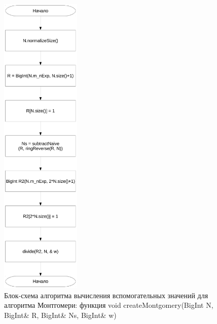 \documentclass[a4paper,12pt]{article} %
\begin{document}
\begin{figure}[ht]
	\centering
	\includegraphics[width=0.34\textwidth]{lr5_createMontgomery.pdf}
	\caption{
		Блок-схема алгоритма вычисления вспомогательных значений для алгоритма Монтгомери:
		функция void createMontgomery(BigInt N, BigInt\& R, BigInt\& Ns, BigInt\& w)
	}
	\label{bs_lr5_createMontgomery}
\end{figure}
\end{document}
